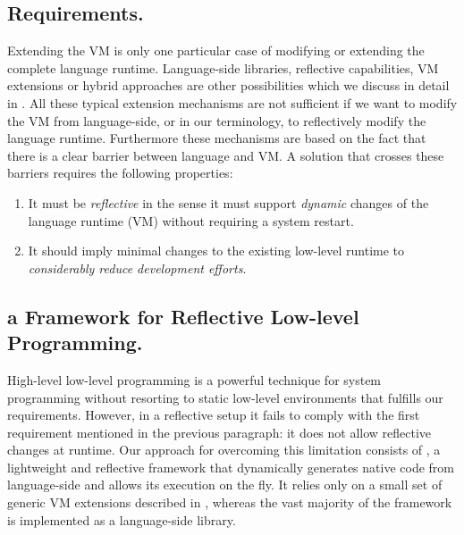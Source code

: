 
\subsection{Requirements.}
Extending the VM is only one particular case of modifying or extending the complete language runtime.
Language-side libraries, reflective capabilities, VM extensions or hybrid approaches are other possibilities which we discuss in detail in .
All these typical extension mechanisms are not sufficient if we want to modify the VM from language-side, or in our terminology, to reflectively modify the language runtime. Furthermore these mechanisms are based on the fact that there is a clear barrier between language and VM.
A solution that crosses these barriers requires the following properties:


\begin{enumerate}
	\item It must be \emph{reflective} in the sense it must support \emph{dynamic} changes of the language runtime (VM) without requiring a system restart.
	\item It should imply minimal changes to the existing low-level runtime to \emph{considerably reduce development efforts}.
\end{enumerate}


\subsection{\B a Framework for Reflective Low-level Programming.}

High-level low-level programming is a powerful technique for system programming without resorting to static low-level environments \cite{Fram09a,Wimm13a} that  fulfills our requirements.
However, in a reflective setup it fails to comply with the first requirement mentioned in the previous paragraph: it does not allow reflective changes at runtime.
Our approach for overcoming this limitation consists of \B, a lightweight and reflective framework that dynamically generates native code from language-side and allows its execution on the fly.
It relies only on a small set of generic VM extensions described in , whereas the vast majority of the framework is implemented as a language-side library.

